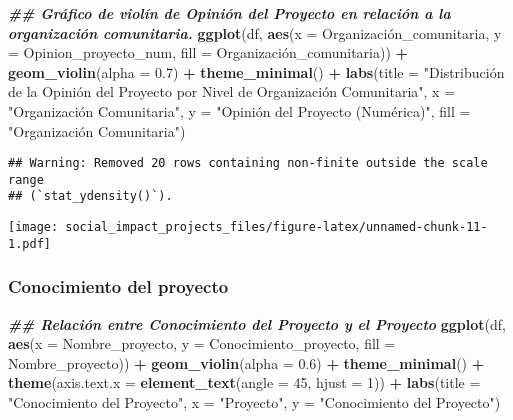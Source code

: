 \documentclass[
]{article}
\newenvironment{Shaded}{\begin{snugshade}}{\end{snugshade}}
\newcommand{\AttributeTok}[1]{\textcolor[rgb]{0.13,0.29,0.53}{#1}}
\newcommand{\DecValTok}[1]{\textcolor[rgb]{0.00,0.00,0.81}{#1}}
\newcommand{\DocumentationTok}[1]{\textcolor[rgb]{0.56,0.35,0.01}{\textbf{\textit{#1}}}}
\newcommand{\FloatTok}[1]{\textcolor[rgb]{0.00,0.00,0.81}{#1}}
\newcommand{\FunctionTok}[1]{\textcolor[rgb]{0.13,0.29,0.53}{\textbf{#1}}}
\newcommand{\NormalTok}[1]{#1}
\newcommand{\SpecialCharTok}[1]{\textcolor[rgb]{0.81,0.36,0.00}{\textbf{#1}}}
\newcommand{\StringTok}[1]{\textcolor[rgb]{0.31,0.60,0.02}{#1}}
\begin{document}
\begin{Shaded}
\begin{Highlighting}[]
\DocumentationTok{\#\# Gráfico de violín de Opinión del Proyecto en relación a la organización comunitaria.}
\FunctionTok{ggplot}\NormalTok{(df, }\FunctionTok{aes}\NormalTok{(}\AttributeTok{x =}\NormalTok{ Organización\_comunitaria, }\AttributeTok{y =}\NormalTok{ Opinion\_proyecto\_num, }\AttributeTok{fill =}\NormalTok{ Organización\_comunitaria)) }\SpecialCharTok{+}
  \FunctionTok{geom\_violin}\NormalTok{(}\AttributeTok{alpha =} \FloatTok{0.7}\NormalTok{) }\SpecialCharTok{+}
  \FunctionTok{theme\_minimal}\NormalTok{() }\SpecialCharTok{+}
  \FunctionTok{labs}\NormalTok{(}\AttributeTok{title =} \StringTok{"Distribución de la Opinión del Proyecto por Nivel de Organización Comunitaria"}\NormalTok{, }
       \AttributeTok{x =} \StringTok{"Organización Comunitaria"}\NormalTok{, }\AttributeTok{y =} \StringTok{"Opinión del Proyecto (Numérica)"}\NormalTok{, }\AttributeTok{fill =} \StringTok{"Organización Comunitaria"}\NormalTok{)}
\end{Highlighting}
\end{Shaded}

\begin{verbatim}
## Warning: Removed 20 rows containing non-finite outside the scale range
## (`stat_ydensity()`).
\end{verbatim}

\texttt{[image: social\_impact\_projects\_files/figure-latex/unnamed-chunk-11-1.pdf]}

\subsubsection{\texorpdfstring{\textbf{Conocimiento del
proyecto}}{Conocimiento del proyecto}}\label{conocimiento-del-proyecto}

\begin{Shaded}
\begin{Highlighting}[]
\DocumentationTok{\#\# Relación entre Conocimiento del Proyecto y el Proyecto}
\FunctionTok{ggplot}\NormalTok{(df, }\FunctionTok{aes}\NormalTok{(}\AttributeTok{x =}\NormalTok{ Nombre\_proyecto, }\AttributeTok{y =}\NormalTok{ Conocimiento\_proyecto, }\AttributeTok{fill =}\NormalTok{ Nombre\_proyecto)) }\SpecialCharTok{+}
  \FunctionTok{geom\_violin}\NormalTok{(}\AttributeTok{alpha =} \FloatTok{0.6}\NormalTok{) }\SpecialCharTok{+}
  \FunctionTok{theme\_minimal}\NormalTok{() }\SpecialCharTok{+}
  \FunctionTok{theme}\NormalTok{(}\AttributeTok{axis.text.x =} \FunctionTok{element\_text}\NormalTok{(}\AttributeTok{angle =} \DecValTok{45}\NormalTok{, }\AttributeTok{hjust =} \DecValTok{1}\NormalTok{)) }\SpecialCharTok{+}
  \FunctionTok{labs}\NormalTok{(}\AttributeTok{title =} \StringTok{"Conocimiento del Proyecto"}\NormalTok{, }\AttributeTok{x =} \StringTok{"Proyecto"}\NormalTok{, }\AttributeTok{y =} \StringTok{"Conocimiento del Proyecto"}\NormalTok{)}
\end{Highlighting}
\end{Shaded}
\end{document}
